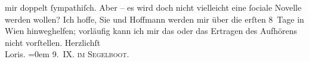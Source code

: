 \begin{ledgroupsized}[t]{13cm}
                    mir doppelt ſympathiſch.\pend
           \pstart
           Aber – es wird doch nicht vielleicht eine ſociale Novelle werden wollen? Ich
                    hoffe, Sie und Hoffmann werden mir über die
                    erſten 8 Tage in {\pb}Wien hinweghelfen; vorläufig kann ich mir das
                        \label{K_L00038_2v}\label{K_L00038_2h}
                    oder das Ertragen des Aufhörens nicht vorſtellen.\pend
           \pstart
           Herzlichſt{\\[\baselineskip]}\spacefill\mbox{Loris.}\pend
           \leftskip=0em{}\pstart
           \textsc{9. IX. im Segelboot.}\pend
                     \endnumbering{}\end{ledgroupsized}  \newcommand{\dateiname}{L00038}\newcommand{\titel}{Hugo von Hofmannsthal an Arthur Schnitzler, 9. 9. [1891]}\newcommand{\editorInnen}{Martin Anton Müller und Gerd-Hermann Susen}
            \footnotesize
\begin{ledgroupsized}[t]{11.5cm}
\end{ledgroupsized}
         
      